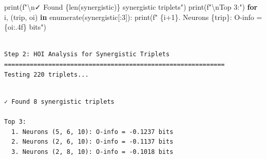 \documentclass[
  11pt,
  letterpaper,
  oneside,
  openany]{book}
\newenvironment{Shaded}{\begin{snugshade}}{\end{snugshade}}
\newcommand{\BuiltInTok}[1]{\textcolor[rgb]{0.00,0.23,0.31}{#1}}
\newcommand{\CharTok}[1]{\textcolor[rgb]{0.13,0.47,0.30}{#1}}
\newcommand{\ControlFlowTok}[1]{\textcolor[rgb]{0.00,0.23,0.31}{\textbf{#1}}}
\newcommand{\DecValTok}[1]{\textcolor[rgb]{0.68,0.00,0.00}{#1}}
\newcommand{\KeywordTok}[1]{\textcolor[rgb]{0.00,0.23,0.31}{\textbf{#1}}}
\newcommand{\NormalTok}[1]{\textcolor[rgb]{0.00,0.23,0.31}{#1}}
\newcommand{\OperatorTok}[1]{\textcolor[rgb]{0.37,0.37,0.37}{#1}}
\newcommand{\SpecialCharTok}[1]{\textcolor[rgb]{0.37,0.37,0.37}{#1}}
\newcommand{\SpecialStringTok}[1]{\textcolor[rgb]{0.13,0.47,0.30}{#1}}
\begin{document}
\begin{Shaded}
\begin{Highlighting}[]
\BuiltInTok{print}\NormalTok{(}\SpecialStringTok{f"}\CharTok{\textbackslash{}n}\SpecialStringTok{✓ Found }\SpecialCharTok{\{}\BuiltInTok{len}\NormalTok{(synergistic)}\SpecialCharTok{\}}\SpecialStringTok{ synergistic triplets"}\NormalTok{)}
\BuiltInTok{print}\NormalTok{(}\SpecialStringTok{f"}\CharTok{\textbackslash{}n}\SpecialStringTok{Top 3:"}\NormalTok{)}
\ControlFlowTok{for}\NormalTok{ i, (trip, oi) }\KeywordTok{in} \BuiltInTok{enumerate}\NormalTok{(synergistic[:}\DecValTok{3}\NormalTok{]):}
    \BuiltInTok{print}\NormalTok{(}\SpecialStringTok{f"  }\SpecialCharTok{\{}\NormalTok{i}\OperatorTok{+}\DecValTok{1}\SpecialCharTok{\}}\SpecialStringTok{. Neurons }\SpecialCharTok{\{}\NormalTok{trip}\SpecialCharTok{\}}\SpecialStringTok{: O{-}info = }\SpecialCharTok{\{}\NormalTok{oi}\SpecialCharTok{:.4f\}}\SpecialStringTok{ bits"}\NormalTok{)}
\end{Highlighting}
\end{Shaded}

\begin{verbatim}

Step 2: HOI Analysis for Synergistic Triplets
============================================================
Testing 220 triplets...
\end{verbatim}

\begin{verbatim}

✓ Found 8 synergistic triplets

Top 3:
  1. Neurons (5, 6, 10): O-info = -0.1237 bits
  2. Neurons (2, 6, 10): O-info = -0.1137 bits
  3. Neurons (2, 8, 10): O-info = -0.1018 bits
\end{verbatim}
\end{document}
